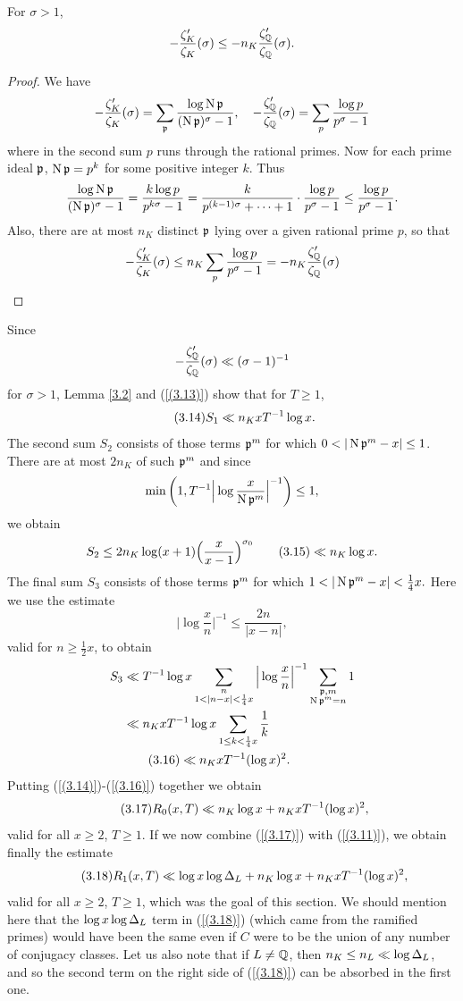 \documentclass[./main]{subfiles}
\begin{document}
\begin{lemma}\label{3.2}
For $\sigma>1$,
\[-\frac{\zeta_K' }{\zeta_K}(\sigma)\le -n_K \frac{\zeta_{\mathbb{Q}} ' }{\zeta_{\mathbb{Q}} }(\sigma). \]
\end{lemma}
\begin{proof}
We have
\[ -\frac{\zeta_K' }{\zeta_K}(\sigma)=\sum_{\mathfrak{p}}\frac{\log \operatorname{N}\mathfrak{p}}{(\operatorname{N}\mathfrak{p})^\sigma-1}, \quad -\frac{\zeta_{\mathbb{Q}} ' }{\zeta_{\mathbb{Q}} }(\sigma)=\sum_p \frac{\log p}{p^\sigma-1}\]
where in the second sum $p$ runs through the rational primes. Now for each prime ideal $\mathfrak{p}$, $\operatorname{N}\mathfrak{p}=p^k$ for some positive integer $k$. Thus
\[ \frac{\log \operatorname{N}\mathfrak{p}}{(\operatorname{N}\mathfrak{p})^\sigma-1}=\frac{k \log p}{p^{k\sigma}-1}=\frac{k}{p^{(k-1)\sigma}+ \dots +1 }\cdot \frac{\log p}{p^\sigma-1}\le \frac{\log p}{p^{\sigma}-1}. \]
Also, there are at most $n_K$ distinct $\mathfrak{p}$ lying over a given rational prime $p$, so that
\[ -\frac{\zeta_K' }{\zeta_K}(\sigma)\le n_K \sum_p \frac{\log p}{p^\sigma-1}=-n_K\frac{\zeta_{\mathbb{Q}} ' }{\zeta_{\mathbb{Q}} }(\sigma)\]
\end{proof}
Since 
\[-\frac{\zeta_{\mathbb{Q}}'}{\zeta_{\mathbb{Q}} }(\sigma)\ll(\sigma-1)^{-1} \]
for $\sigma>1$, Lemma \ref{3.2}
and (\ref{(3.13)}) show that for $T\ge 1$, 
\[\tag{3.14}\label{(3.14)} S_1 \ll n_KxT^{-1}\log x.\]
The second sum $S_2$ consists of those terms $\mathfrak{p}^m$ for which $0<|\norm\p^m-x| \le 1$. There are at most $2n_K$ of such $\mathfrak{p}^m$ and since
\[ \min\bigg(1, T^{-1}\Big| \log \frac{x}{\operatorname{N}\mathfrak{p}^m}\Big|^{-1}\bigg) \le 1,\]
we obtain
\[
    S_2  \le 2n_K\log(x+1) \Big(\frac{x}{x-1}\Big)^{\sigma_0} 
     \label{3.15}\tag{3.15}\ll  n_K\log x.
\]
The final sum $S_3$ consists of those terms $\mathfrak{p}^m$ for which $1 < |\operatorname{N}\mathfrak{p}^m-x|<\frac{1}{4}x.$ Here we use the estimate
\[ \Big|\log \frac{x}{n}\Big|^{-1}\le \frac{2n}{|x-n|}, \]
valid for $n\ge \frac{1}{2}x$, to obtain
\begin{align*}
    S_3&\ll T^{-1}\log x \sum_{\substack{n \\ 1< |n-x|< \frac{1}{4}x}}\Big|\log \frac{x}{n}\Big|^{-1}\sum_{\substack{\mathfrak{p}, m \\ \operatorname{N}\mathfrak{p}^m=n}}1 \\
    & \ll n_KxT^{-1}\log x \sum_{1 \le k < \frac{1}{4}x} \frac{1}{k} \\
    & \label{(3.16)} \tag{3.16}\ll n_K xT^{-1}(\log x)^2.
\end{align*}
Putting (\ref{(3.14)})-(\ref{(3.16)}) together we obtain
\[\label{(3.17)} \tag{3.17} R_0(x,T) \ll n_K\log x + n_KxT^{-1}(\log x)^2,\]
valid for all $x \ge 2$, $T\ge 1$. If we now combine (\ref{(3.17)}) with (\ref{(3.11)}), we obtain finally the estimate
\[\label{(3.18)} \tag{3.18} R_1(x,T) \ll\log x \log \Delta_L+n_K\log x+ n_KxT^{-1}(\log x)^2,  \]
valid for all $x \ge 2$, $T\ge 1$, which was the goal of this section. We should mention here that the $\log x \log \Delta_L$ term in (\ref{(3.18)}) (which came from the ramified primes) would have been the same even if $C$ were to be the union of any number of conjugacy classes. Let us also note that if $L \neq \mathbb{Q} $, then $n_K \le n_L \ll \log \Delta_L$, and so the second term on the right side of (\ref{(3.18)}) can be absorbed in the first one.
\end{document}
